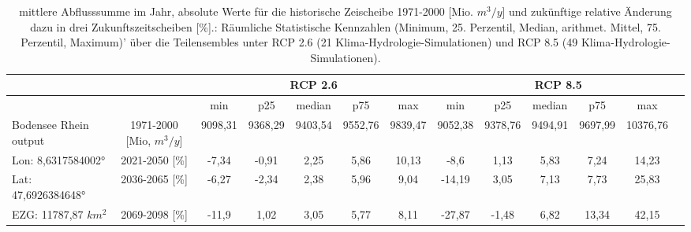 \renewcommand{\arraystretch}{1.2}
\addtolength{\tabcolsep}{-5.9pt}
\scriptsize
\begin{longtable}{@{\extracolsep{\fill}}lc|ccccc||cccccc}
\caption{mittlere Abflusssumme im Jahr, absolute Werte für die historische Zeischeibe 1971-2000 [Mio. $m^3/y$] und zukünftige relative Änderung dazu in drei Zukunftszeitscheiben [\%].: Räumliche Statistische Kennzahlen (Minimum, 25. Perzentil, Median, arithmet. Mittel, 75. Perzentil, Maximum)' über die Teilensembles unter RCP 2.6 (21 Klima-Hydrologie-Simulationen) und RCP 8.5 (49 Klima-Hydrologie-Simulationen).}\\  \hline
\multicolumn{2}{c}{} & \multicolumn{5}{c||}{RCP 2.6}  & \multicolumn{6}{c}{RCP 8.5}\\ \hline
\multicolumn{2}{c|}{} & min & p25 & median & p75 & max & min & p25 & median & p75 & max\\ 
\hline 
Bodensee Rhein output & 1971-2000 [Mio, $m^3/y$]  & 9098,31 & 9368,29 & 9403,54 & 9552,76 & 9839,47 & 9052,38 & 9378,76 & 9494,91 & 9697,99 & 10376,76 & \\ 
\cline{1-13} 
Lon: 8,6317584002° & 2021-2050 [\%]  & -7,34 & -0,91 & 2,25 & 5,86 & 10,13 & -8,6 & 1,13 & 5,83 & 7,24 & 14,23 & \\ 
Lat: 47,6926384648° & 2036-2065 [\%]  & -6,27 & -2,34 & 2,38 & 5,96 & 9,04 & -14,19 & 3,05 & 7,13 & 7,73 & 25,83 & \\ 
EZG: 11787,87 $km^2$ & 2069-2098 [\%]  & -11,9 & 1,02 & 3,05 & 5,77 & 8,11 & -27,87 & -1,48 & 6,82 & 13,34 & 42,15 & \\\hline
\end{longtable}
\addtolength{\tabcolsep}{5.9pt}
